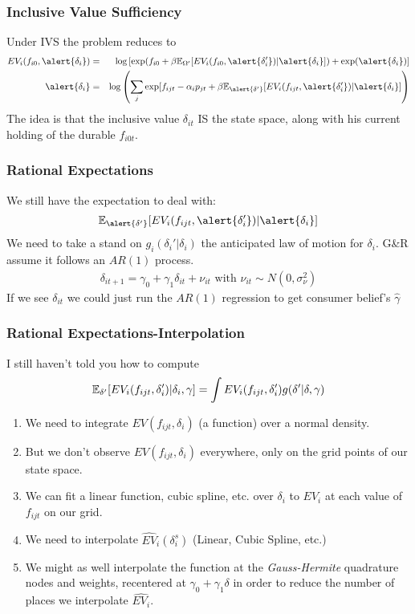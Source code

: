 \begin{frame}
\frametitle{Inclusive Value Sufficiency}
Under IVS the problem reduces to
\begin{eqnarray*}
EV_i(f_{i0}, \alert{\delta_i}) &=& \log\left[ \exp( f_{i0} + \beta \E_{\Omega'}[ EV_i (f_{i0}, \alert{\delta_i'}) |\alert{\delta_i}] )+ \exp(\alert{\delta_i})  \right]\\
\alert{\delta_{i}} &=& \log \left( \sum_j \exp[ f_{ijt}  -\alpha_i p_{jt} + \beta \E_{\alert{\delta'}}[ E V_i (f_{ijt}, \alert{\delta_i'}) |\alert{\delta_i} ]  \right)
\end{eqnarray*}
The idea is that the inclusive value $\delta_{it}$ IS the state space, along with his current holding of the durable $f_{i0t}$.
\end{frame}


\begin{frame}
\frametitle{Rational Expectations}
We still have the expectation to deal with: 
\begin{eqnarray*}
\E_{\alert{\delta'}}[ E V_i (f_{ijt}, \alert{\delta_i'}) |\alert{\delta_i} ]
\end{eqnarray*}
We need to take a stand on $g_i(\delta_i' | \delta_i)$ the anticipated law of motion for $\delta_i$.  G\&R assume it follows an $AR(1)$ process.
\begin{eqnarray*}
\delta_{it+1} = \gamma_0 + \gamma_1 \delta_{it} + \nu_{it} \mbox{ with } \nu_{it} \sim N(0,\sigma_{\nu}^2)
\end{eqnarray*}
If we see $\delta_{it}$ we could just run the $AR(1)$ regression to get consumer belief's $\hat{\gamma}$
\end{frame}


\begin{frame}
\frametitle{Rational Expectations-Interpolation}
I still haven't told you how to compute
\begin{eqnarray*}
\mathbb{E}_{\delta'}[ E V_i (f_{ijt}, \delta_i') |\delta_i ,\gamma]= \int EV_i(f_{ijt},\delta_{i}') g(\delta' | \delta,\gamma)
\end{eqnarray*}
\vspace{-0.5cm}
\begin{enumerate}
\item We need to integrate $EV(f_{ijt},\delta_i)$ (a function) over a normal density.
\item But we don't observe $EV(f_{ijt},\delta_i)$ everywhere, only on the grid points of our state space.
\item We can fit a linear function, cubic spline, etc. over $\delta_i$ to $EV_i$ at each value of $f_{ijt}$ on our grid.
\item  We need to \alert{interpolate} $\widehat{EV}_i(\delta_i^s)$ (Linear, Cubic Spline, etc.)
\item We might as well interpolate the function at the \textit{Gauss-Hermite} quadrature nodes and weights, recentered at $\gamma_0 + \gamma_1 \delta$ in order to reduce the number of places we interpolate $\widehat{EV_i}$.
\end{enumerate}
\end{frame}

